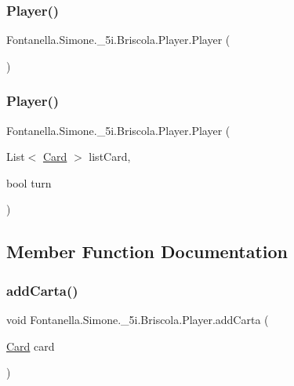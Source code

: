 \subsubsection{\texorpdfstring{Player()}{Player()}\hspace{0.1cm}{\footnotesize\ttfamily [1/2]}}
{\footnotesize\ttfamily Fontanella.\+Simone.\+\_\+5i.\+Briscola.\+Player.\+Player (\begin{DoxyParamCaption}{ }\end{DoxyParamCaption})}

\hypertarget{class_fontanella_1_1_simone_1_1__5i_1_1_briscola_1_1_player_aef3390197ac09b8e799c3144c0a33bb6}{}\label{class_fontanella_1_1_simone_1_1__5i_1_1_briscola_1_1_player_aef3390197ac09b8e799c3144c0a33bb6} 
\subsubsection{\texorpdfstring{Player()}{Player()}\hspace{0.1cm}{\footnotesize\ttfamily [2/2]}}
{\footnotesize\ttfamily Fontanella.\+Simone.\+\_\+5i.\+Briscola.\+Player.\+Player (\begin{DoxyParamCaption}\item[{List$<$ \hyperlink{class_fontanella_1_1_simone_1_1__5i_1_1_briscola_1_1_card}{Card} $>$}]{list\+Card,  }\item[{bool}]{turn }\end{DoxyParamCaption})}



\subsection{Member Function Documentation}
\hypertarget{class_fontanella_1_1_simone_1_1__5i_1_1_briscola_1_1_player_ac4efbc7a4c7809d9a54cefdba76cf771}{}\label{class_fontanella_1_1_simone_1_1__5i_1_1_briscola_1_1_player_ac4efbc7a4c7809d9a54cefdba76cf771} 
\subsubsection{\texorpdfstring{add\+Carta()}{addCarta()}}
{\footnotesize\ttfamily void Fontanella.\+Simone.\+\_\+5i.\+Briscola.\+Player.\+add\+Carta (\begin{DoxyParamCaption}\item[{\hyperlink{class_fontanella_1_1_simone_1_1__5i_1_1_briscola_1_1_card}{Card}}]{card }\end{DoxyParamCaption})}



